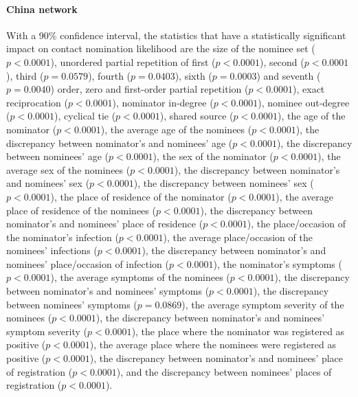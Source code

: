 \paragraph{China network} With a 90\% confidence interval, the statistics that have a statistically significant impact on contact nomination likelihood are the size of the nominee set ($p<0.0001$), unordered partial repetition of first ($p<0.0001$), second ($p<0.0001$), third ($p=0.0579$), fourth ($p=0.0403$), sixth ($p=0.0003$) and seventh ($p=0.0040$) order, zero and first-order partial repetition ($p<0.0001$), exact reciprocation ($p<0.0001$), nominator in-degree ($p<0.0001$), nominee out-degree ($p<0.0001$), cyclical tie ($p<0.0001$), shared source ($p<0.0001$), the age of the nominator ($p<0.0001$), the average age of the nominees ($p<0.0001$), the discrepancy between nominator's and nominees' age ($p<0.0001$), the discrepancy between nominees' age ($p<0.0001$), the sex of the nominator ($p<0.0001$), the average sex of the nominees ($p<0.0001$), the discrepancy between nominator's and nominees' sex ($p<0.0001$), the discrepancy between nominees' sex ($p<0.0001$), the place of residence of the nominator ($p<0.0001$), the average place of residence of the nominees ($p<0.0001$), the discrepancy between nominator's and nominees' place of residence ($p<0.0001$), the place/occasion of the nominator's infection ($p<0.0001$), the average place/occasion of the nominees' infections ($p<0.0001$), the discrepancy between nominator's and nominees' place/occasion of infection ($p<0.0001$), the nominator's symptoms ($p<0.0001$), the average symptoms of the nominees ($p<0.0001$), the discrepancy between nominator's and nominees' symptoms ($p<0.0001$), the discrepancy between nominees' symptoms ($p=0.0869$), the average symptom severity of the nominees ($p<0.0001$), the discrepancy between nominator's and nominees' symptom severity ($p<0.0001$), the place where the nominator was registered as positive ($p<0.0001$), the average place where the nominees were registered as positive ($p<0.0001$), the discrepancy between nominator's and nominees' place of registration ($p<0.0001$), and the discrepancy between nominees' places of registration ($p<0.0001$). 

